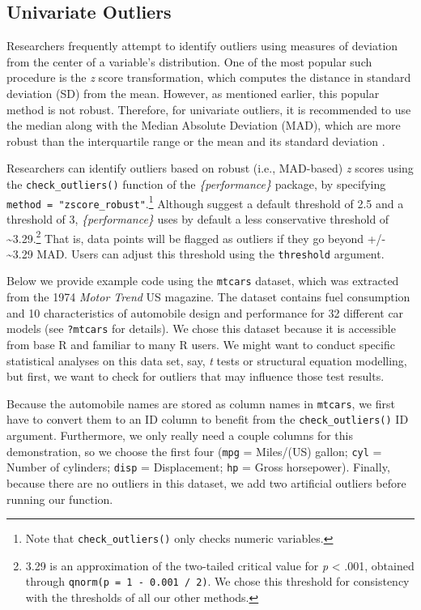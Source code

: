 \documentclass[sn-basic, lineno,pdflatex]{sn-jnl}
\begin{document}
\subsection{Univariate Outliers}\label{univariate-outliers}

Researchers frequently attempt to identify outliers using measures of
deviation from the center of a variable's distribution. One of the most
popular such procedure is the \emph{z} score transformation, which
computes the distance in standard deviation (SD) from the mean. However,
as mentioned earlier, this popular method is not robust. Therefore, for
univariate outliers, it is recommended to use the median along with the
Median Absolute Deviation (MAD), which are more robust than the
interquartile range or the mean and its standard deviation
\citep{leys2019outliers, leys2013outliers}.

Researchers can identify outliers based on robust (i.e., MAD-based)
\emph{z} scores using the \texttt{check\_outliers()} function of the
\emph{\{performance\}} package, by specifying
\texttt{method\ =\ "zscore\_robust"}.\footnote{Note that
  \texttt{check\_outliers()} only checks numeric variables.} Although
\citet{leys2013outliers} suggest a default threshold of 2.5 and
\citet{leys2019outliers} a threshold of 3, \emph{\{performance\}} uses
by default a less conservative threshold of
\textasciitilde3.29.\footnote{3.29 is an approximation of the two-tailed
  critical value for \emph{p} \textless{} .001, obtained through
  \texttt{qnorm(p\ =\ 1\ -\ 0.001\ /\ 2)}. We chose this threshold for
  consistency with the thresholds of all our other methods.} That is,
data points will be flagged as outliers if they go beyond +/-
\textasciitilde3.29 MAD. Users can adjust this threshold using the
\texttt{threshold} argument.

Below we provide example code using the \texttt{mtcars} dataset, which
was extracted from the 1974 \emph{Motor Trend} US magazine. The dataset
contains fuel consumption and 10 characteristics of automobile design
and performance for 32 different car models (see \texttt{?mtcars} for
details). We chose this dataset because it is accessible from base R and
familiar to many R users. We might want to conduct specific statistical
analyses on this data set, say, \emph{t} tests or structural equation
modelling, but first, we want to check for outliers that may influence
those test results.

Because the automobile names are stored as column names in
\texttt{mtcars}, we first have to convert them to an ID column to
benefit from the \texttt{check\_outliers()} ID argument. Furthermore, we
only really need a couple columns for this demonstration, so we choose
the first four (\texttt{mpg} = Miles/(US) gallon; \texttt{cyl} = Number
of cylinders; \texttt{disp} = Displacement; \texttt{hp} = Gross
horsepower). Finally, because there are no outliers in this dataset, we
add two artificial outliers before running our function.
\end{document}
